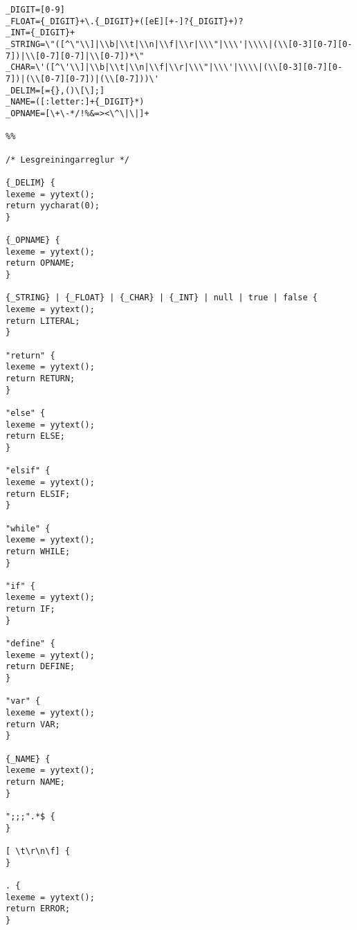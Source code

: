 \documentclass[]{article}
\begin{document}
\begin{lstlisting}
_DIGIT=[0-9]
_FLOAT={_DIGIT}+\.{_DIGIT}+([eE][+-]?{_DIGIT}+)?
_INT={_DIGIT}+
_STRING=\"([^\"\\]|\\b|\\t|\\n|\\f|\\r|\\\"|\\\'|\\\\|(\\[0-3][0-7][0-7])|\\[0-7][0-7]|\\[0-7])*\"
_CHAR=\'([^\'\\]|\\b|\\t|\\n|\\f|\\r|\\\"|\\\'|\\\\|(\\[0-3][0-7][0-7])|(\\[0-7][0-7])|(\\[0-7]))\'
_DELIM=[={},()\[\];]
_NAME=([:letter:]+{_DIGIT}*)
_OPNAME=[\+\-*/!%&=><\^\|\|]+

%%

/* Lesgreiningarreglur */

{_DELIM} {
lexeme = yytext();
return yycharat(0);
}

{_OPNAME} {
lexeme = yytext();
return OPNAME;
}

{_STRING} | {_FLOAT} | {_CHAR} | {_INT} | null | true | false {
lexeme = yytext();
return LITERAL;
}

"return" {
lexeme = yytext();
return RETURN;
}

"else" {
lexeme = yytext();
return ELSE;
}

"elsif" {
lexeme = yytext();
return ELSIF;
}

"while" {
lexeme = yytext();
return WHILE;
}

"if" {
lexeme = yytext();
return IF;
}

"define" {
lexeme = yytext();
return DEFINE;
}

"var" {
lexeme = yytext();
return VAR;
}

{_NAME} {
lexeme = yytext();
return NAME;
}

";;;".*$ {
}

[ \t\r\n\f] {
}

. {
lexeme = yytext();
return ERROR;
}

\end{lstlisting}
\end{document}
